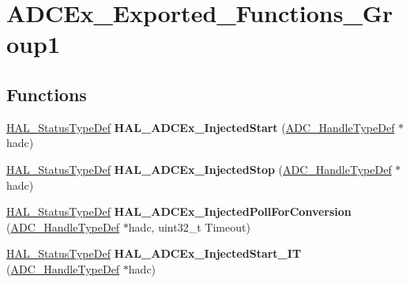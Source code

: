 \hypertarget{group___a_d_c_ex___exported___functions___group1}{}\section{A\+D\+C\+Ex\+\_\+\+Exported\+\_\+\+Functions\+\_\+\+Group1}
\label{group___a_d_c_ex___exported___functions___group1}
\subsection*{Functions}
\begin{DoxyCompactItemize}
\item 
\hyperlink{stm32f4xx__hal__def_8h_a63c0679d1cb8b8c684fbb0632743478f}{H\+A\+L\+\_\+\+Status\+Type\+Def} {\bfseries H\+A\+L\+\_\+\+A\+D\+C\+Ex\+\_\+\+Injected\+Start} (\hyperlink{struct_a_d_c___handle_type_def}{A\+D\+C\+\_\+\+Handle\+Type\+Def} $\ast$hadc)\hypertarget{group___a_d_c_ex___exported___functions___group1_gaa666882ff772df8a5140090422825ed6}{}\label{group___a_d_c_ex___exported___functions___group1_gaa666882ff772df8a5140090422825ed6}

\item 
\hyperlink{stm32f4xx__hal__def_8h_a63c0679d1cb8b8c684fbb0632743478f}{H\+A\+L\+\_\+\+Status\+Type\+Def} {\bfseries H\+A\+L\+\_\+\+A\+D\+C\+Ex\+\_\+\+Injected\+Stop} (\hyperlink{struct_a_d_c___handle_type_def}{A\+D\+C\+\_\+\+Handle\+Type\+Def} $\ast$hadc)\hypertarget{group___a_d_c_ex___exported___functions___group1_ga91f6c85ae910e9baaf578a346c30c7c1}{}\label{group___a_d_c_ex___exported___functions___group1_ga91f6c85ae910e9baaf578a346c30c7c1}

\item 
\hyperlink{stm32f4xx__hal__def_8h_a63c0679d1cb8b8c684fbb0632743478f}{H\+A\+L\+\_\+\+Status\+Type\+Def} {\bfseries H\+A\+L\+\_\+\+A\+D\+C\+Ex\+\_\+\+Injected\+Poll\+For\+Conversion} (\hyperlink{struct_a_d_c___handle_type_def}{A\+D\+C\+\_\+\+Handle\+Type\+Def} $\ast$hadc, uint32\+\_\+t Timeout)\hypertarget{group___a_d_c_ex___exported___functions___group1_ga5e11b306be79f36c71a73f2e465ad613}{}\label{group___a_d_c_ex___exported___functions___group1_ga5e11b306be79f36c71a73f2e465ad613}

\item 
\hyperlink{stm32f4xx__hal__def_8h_a63c0679d1cb8b8c684fbb0632743478f}{H\+A\+L\+\_\+\+Status\+Type\+Def} {\bfseries H\+A\+L\+\_\+\+A\+D\+C\+Ex\+\_\+\+Injected\+Start\+\_\+\+IT} (\hyperlink{struct_a_d_c___handle_type_def}{A\+D\+C\+\_\+\+Handle\+Type\+Def} $\ast$hadc)\hypertarget{group___a_d_c_ex___exported___functions___group1_gaf55cd28b1394a0564f99e1f5069c0ed1}{}\label{group___a_d_c_ex___exported___functions___group1_gaf55cd28b1394a0564f99e1f5069c0ed1}


\end{DoxyCompactItemize}
